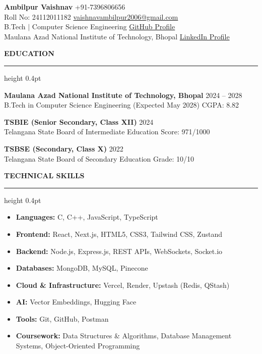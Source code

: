 \documentclass[a4paper,10pt]{article}
\newcommand{\ressection}[1]{%
  \vspace{8pt}%
  {\large\bfseries #1}\par%
  \kern 5pt%
  \hrule height 0.4pt%
  \vspace{4pt}%
}
\begin{document}
\vspace*{-\baselineskip}
\noindent
{\Large \textbf{Ambilpur Vaishnav}} \hfill +91-7396806656 \\[0.5pt]
\noindent
Roll No: 24112011182 \hfill \href{mailto:vaishnavambilpur2006@gmail.com}{vaishnavambilpur2006@gmail.com} \\[0.5pt]
\noindent
B.Tech $|$ Computer Science Engineering \hfill \href{https://github.com/VaishnavAmbilpur}{GitHub Profile} \\[0.5pt]
\noindent
Maulana Azad National Institute of Technology, Bhopal \hfill \href{https://www.linkedin.com/in/vaishnav-ambilpur-005a2a304/}{LinkedIn Profile}
\vspace{-3pt}

\ressection{EDUCATION}
\vspace{2pt}
\noindent\textbf{Maulana Azad National Institute of Technology, Bhopal} \hfill 2024 -- 2028 \\
B.Tech in Computer Science Engineering (Expected May 2028) \hfill CGPA: 8.82
\vspace{3pt}

\noindent\textbf{TSBIE (Senior Secondary, Class XII)} \hfill 2024 \\
Telangana State Board of Intermediate Education \hfill Score: 971/1000
\vspace{3pt}

\noindent\textbf{TSBSE (Secondary, Class X)} \hfill 2022 \\
Telangana State Board of Secondary Education \hfill Grade: 10/10

\ressection{TECHNICAL SKILLS}
\begin{itemize}[label={\textbullet}, leftmargin=15pt, itemsep=2pt, topsep=2pt]
  \item \textbf{Languages:} C, C++, JavaScript, TypeScript
  \item \textbf{Frontend:} React, Next.js, HTML5, CSS3, Tailwind CSS, Zustand
  \item \textbf{Backend:} Node.js, Express.js, REST APIs, WebSockets, Socket.io
  \item \textbf{Databases:} MongoDB, MySQL, Pinecone
  \item \textbf{Cloud \& Infrastructure:} Vercel, Render, Upstash (Redis, QStash)
  \item \textbf{AI:} Vector Embeddings, Hugging Face
  \item \textbf{Tools:} Git, GitHub, Postman
  \item \textbf{Coursework:} Data Structures \& Algorithms, Database Management Systems, Object-Oriented Programming
\end{itemize}
\end{document}
